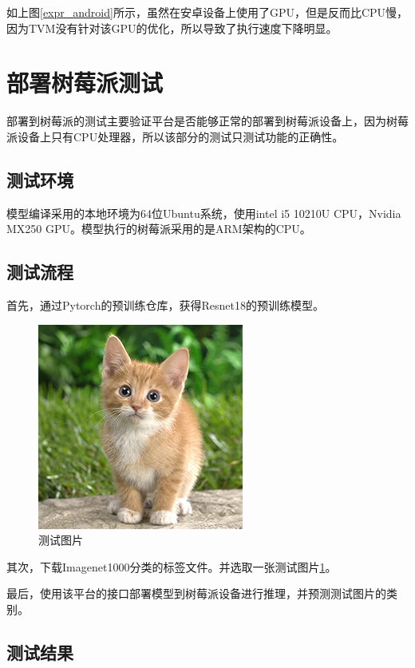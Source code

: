 如上图\ref{expr_android}所示，虽然在安卓设备上使用了GPU，但是反而比CPU慢，因为TVM没有针对该GPU的优化，所以导致了执行速度下降明显。


\section{部署树莓派测试}

部署到树莓派的测试主要验证平台是否能够正常的部署到树莓派设备上，因为树莓派设备上只有CPU处理器，所以该部分的测试只测试功能的正确性。

\subsection{测试环境}

模型编译采用的本地环境为64位Ubuntu系统，使用intel i5 10210U CPU，Nvidia MX250 GPU。模型执行的树莓派采用的是ARM架构的CPU。


\subsection{测试流程}

首先，通过Pytorch的预训练仓库，获得Resnet18的预训练模型。

\begin{figure}[h!]
    \centering
    \includegraphics[width=180bp]{figure/cat.png}
    \caption{测试图片}
    \label{cat}
\end{figure}

其次，下载Imagenet1000分类的标签文件。并选取一张测试图片\ref{cat}。

最后，使用该平台的接口部署模型到树莓派设备进行推理，并预测测试图片的类别。


\subsection{测试结果}

